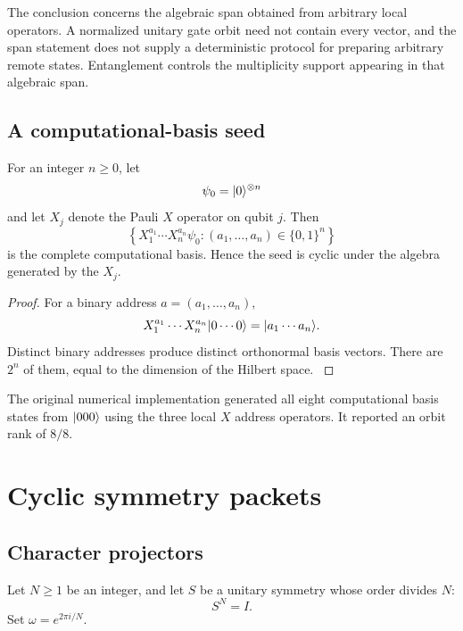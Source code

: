 The conclusion concerns the algebraic span obtained from arbitrary local operators. A normalized unitary gate orbit need not contain every vector, and the span statement does not supply a deterministic protocol for preparing arbitrary remote states. Entanglement controls the multiplicity support appearing in that algebraic span.

\subsection{A computational-basis seed}

\begin{theorem}\label{core:theorem:003}\label{core:thm:computational}
For an integer $n\ge0$, let
\[
\psi_0=\lvert 0\rangle^{\otimes n}
\]
and let $X_j$ denote the Pauli $X$ operator on qubit $j$. Then
\[
\left\{
X_1^{a_1}\cdots X_n^{a_n}\psi_0:
(a_1,\ldots,a_n)\in\{0,1\}^n
\right\}
\]
is the complete computational basis. Hence the seed is cyclic under the algebra generated by the $X_j$.
\end{theorem}

\begin{proof}\label{core:proof:004}
For a binary address $a=(a_1,\ldots,a_n)$,
\[
X_1^{a_1}\cdots X_n^{a_n}\lvert 0\cdots0\rangle
=
\lvert a_1\cdots a_n\rangle.
\]
Distinct binary addresses produce distinct orthonormal basis vectors. There are $2^n$ of them, equal to the dimension of the Hilbert space.
\label{core:proof:004:end}\end{proof}

\begin{certificate}\label{core:certificate:001}
The original numerical implementation generated all eight computational basis states from $\lvert 000\rangle$ using the three local $X$ address operators. It reported an orbit rank of $8/8$.
\end{certificate}

\section{Cyclic symmetry packets}\label{core:section:003}

\subsection{Character projectors}

Let $N\ge1$ be an integer, and let $S$ be a unitary symmetry whose order divides $N$:
\[
S^N=I.
\]
Set $\omega=e^{2\pi i/N}$.

